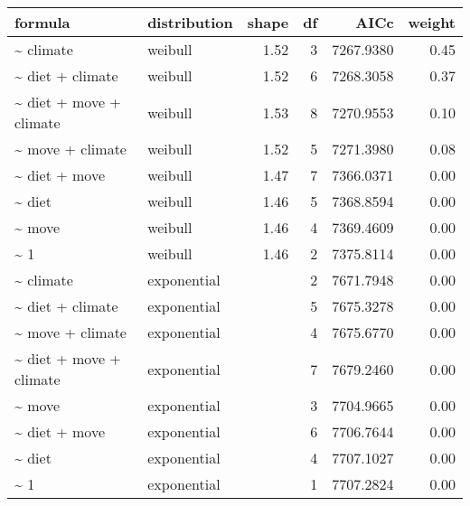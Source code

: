 \begin{table}[ht]
\centering
\begin{tabular}{llrrrr}
 formula & distribution & shape & df & AICc & weight \\ 
  \hline
\~{} climate & weibull & 1.52 & 3 & 7267.9380 & 0.45 \\ 
  \~{} diet + climate & weibull & 1.52 & 6 & 7268.3058 & 0.37 \\ 
  \~{} diet + move + climate & weibull & 1.53 & 8 & 7270.9553 & 0.10 \\ 
  \~{} move + climate & weibull & 1.52 & 5 & 7271.3980 & 0.08 \\ 
  \~{} diet + move & weibull & 1.47 & 7 & 7366.0371 & 0.00 \\ 
  \~{} diet & weibull & 1.46 & 5 & 7368.8594 & 0.00 \\ 
  \~{} move & weibull & 1.46 & 4 & 7369.4609 & 0.00 \\ 
  \~{} 1 & weibull & 1.46 & 2 & 7375.8114 & 0.00 \\ 
  \~{} climate & exponential &  & 2 & 7671.7948 & 0.00 \\ 
  \~{} diet + climate & exponential &  & 5 & 7675.3278 & 0.00 \\ 
  \~{} move + climate & exponential &  & 4 & 7675.6770 & 0.00 \\ 
  \~{} diet + move + climate & exponential &  & 7 & 7679.2460 & 0.00 \\ 
  \~{} move & exponential &  & 3 & 7704.9665 & 0.00 \\ 
  \~{} diet + move & exponential &  & 6 & 7706.7644 & 0.00 \\ 
  \~{} diet & exponential &  & 4 & 7707.1027 & 0.00 \\ 
  \~{} 1 & exponential &  & 1 & 7707.2824 & 0.00 \\ 
  \end{tabular}
\label{tab:er}
\end{table}
